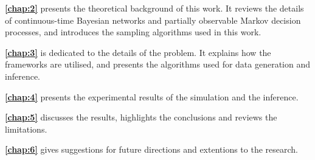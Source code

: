 \textbf{\cref{chap:2}} presents the theoretical background of this work. It reviews the details of continuous-time Bayesian networks and partially observable Markov decision processes, and introduces the sampling algorithms used in this work.

\textbf{\cref{chap:3}} is dedicated to the details of the problem. It explains how the frameworks are utilised, and presents the algorithms used for data generation and inference.

\textbf{\cref{chap:4}} presents the experimental results of the simulation and the inference.

\textbf{\cref{chap:5}} discusses the results, highlights the conclusions and reviews the limitations.

\textbf{\cref{chap:6}} gives suggestions for future directions and extentions to the research.